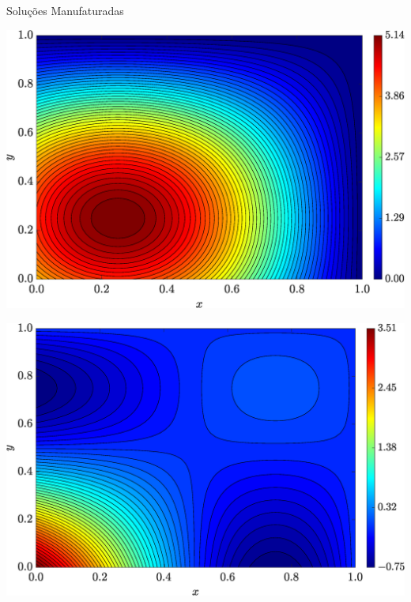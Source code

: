 \begin{frame}{Soluções Manufaturadas}
    \centering
    \captionsetup{justification=centering}
    \label{fig:sol_manufaturadas_311}
    \begin{minipage}{0.31\textwidth}
        \centering
        \includegraphics[width=\textwidth]{Figures/Exact_Map_NormErr_2nd_Betann_0.1_Re_1_Wi_1_epsilon_0_xi_0_alphaG_0_Dt_1e-06_at_0.05_tipsim_1_MMS_12_Txx.eps}
        \label{fig_solexaTxxCase111}
    \end{minipage}
    \hfill
    \begin{minipage}{0.31\textwidth}
        \centering
        \includegraphics[width=\textwidth]{Figures/Exact_Map_NormErr_2nd_Betann_0.1_Re_1_Wi_1_epsilon_0_xi_0_alphaG_0_Dt_1e-06_at_0.05_tipsim_1_MMS_12_Txy.eps}

\end{minipage}
\end{frame}
